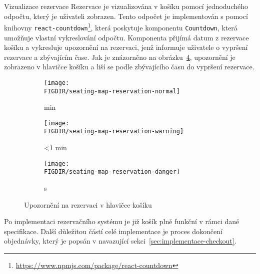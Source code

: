 \begin{subsection}{Vizualizace rezervace}
    \label{subsec:implementace-rezervace-vizualizace}
    Rezervace je vizualizována v košíku pomocí jednoduchého odpočtu, který je uživateli zobrazen.
    Tento odpočet je implementován s pomocí knihovny \texttt{react-countdown}\footnote{\url{https://www.npmjs.com/package/react-countdown}}, která poskytuje komponentu \texttt{Countdown}, která umožňuje vlastní vykreslování odpočtu.
    Komponenta přijímá datum z rezervace košíku a vykresluje upozornění na rezervaci, jenž informuje uživatele o vypršení rezervace a zbývajícím čase.
    Jak je znázorněno na obrázku~\ref{fig:seating-map-reservation}, upozornění je zobrazeno v hlavičce košíku a liší se podle zbývajícího času do vypršení rezervace.

    \begin{figure}[H]
        \centering
        \begin{subfigure}{0.3\textwidth}
            \texttt{[image: \\FIGDIR/seating-map-reservation-normal]}
            \caption{ min}
            \label{fig:seating-map-reservation-normal}
        \end{subfigure}
        \hfill
        \begin{subfigure}{0.3\textwidth}
            \texttt{[image: \\FIGDIR/seating-map-reservation-warning]}
            \caption{\textless 1 min}
            \label{fig:seating-map-reservation-warning}
        \end{subfigure}
        \hfill
        \begin{subfigure}{0.3\textwidth}
            \texttt{[image: \\FIGDIR/seating-map-reservation-danger]}
            \caption{ s}
            \label{fig:seating-map-reservation-danger}
        \end{subfigure}
        \caption{Upozornění na rezervaci v hlavičce košíku}
        \label{fig:seating-map-reservation}
    \end{figure}

    Po implementaci rezervačního systému je již košík plně funkční v rámci dané specifikace.
    Další důležitou částí celé implementace je proces dokončení objednávky, který je popsán v navazující sekci~\ref{sec:implementace-checkout}.
\end{subsection}
